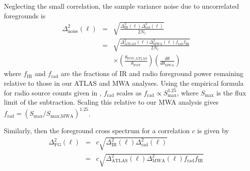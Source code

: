 \documentclass[numberedappendix]{emulateapj}
\newcommand{\rad}{\text{rad}}
\newcommand{\IR}{\text{IR}}
\newcommand{\ir}{\text{IR}}
\newcommand{\fov}{\text{FOV}}
\begin{document}
Neglecting the small correlation, the sample variance noise due to uncorrelated foregrounds is
\begin{eqnarray}
\Delta^2_\text{noise}(\ell) &=& \sqrt{\frac{\Delta^2_\IR(\ell) \Delta^2_\rad(\ell)}{2N_\ell}} \nonumber \\
&=&\sqrt{\frac{\Delta^2_{\text{ATLAS}}(\ell) \Delta^2_{\text{MWA}}(\ell)f_\rad f_\ir}{2N_\ell}} \nonumber \\
&&\times \left( \frac{\theta_{\fov,\text{ATLAS}}}{\theta_\fov}\right)\left(\frac{d\theta}{d\theta_{\text{MWA}}}\right)
\end{eqnarray}
where $f_\ir$ and $f_\rad$ are the fractions of IR and radio foreground power remaining relative to those in our ATLAS and MWA analyses. Using the empirical formula for radio source counts given in \citet{dimatteo02}, $f_\rad$ scales as $f_\rad\propto S_\text{max}^{1.25}$, where $S_\text{max}$ is the flux limit of the subtraction. Scaling this relative to our MWA analysis gives $f_\rad=(S_\text{max}/S_{\text{max},\text{MWA}})^{1.25}$.

Similarly, then the foreground cross spectrum for a correlation $c$ is given by
\begin{eqnarray}
\Delta^2_\text{FG}(\ell)& =&c\sqrt{\Delta^2_\IR(\ell) \Delta^2_\rad(\ell)} \nonumber \\
&=&c\sqrt{\Delta^2_{\text{ATLAS}}(\ell) \Delta^2_{\text{MWA}}(\ell)f_\rad f_\ir }
\end{eqnarray}
\end{document}
